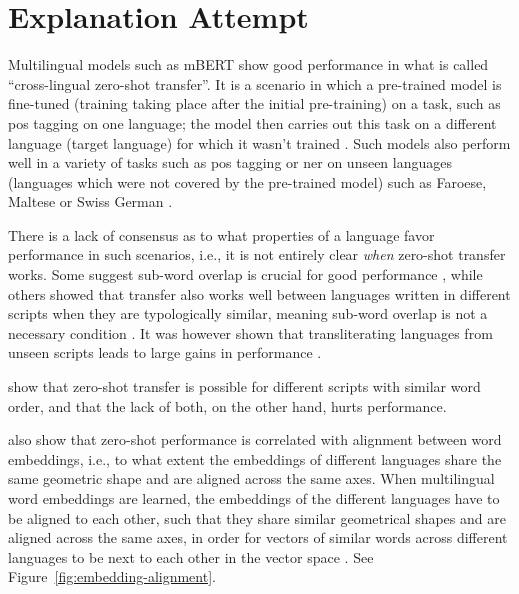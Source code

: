\section{Explanation Attempt}
Multilingual models such as mBERT show good performance in what is called \enquote{cross-lingual zero-shot transfer}. 
It is a scenario in which a pre-trained model is fine-tuned (training taking place after the initial pre-training) on a task, such as \acrshort{pos} tagging on one language; the model then carries out this task on a different language (target language) for which it wasn't trained \autocite{deshpande-etal-2022-bert}.
Such models also perform well in a variety of tasks such as \acrshort{pos} tagging or \acrshort{ner} on unseen languages (languages which were not covered by the pre-trained model) such as Faroese, Maltese or Swiss German \autocite{muller-et-al-2020}.

There is a lack of consensus as to what properties of a language favor performance in such scenarios, i.e., it is not entirely clear  \emph{when} zero-shot transfer works. 
Some suggest sub-word overlap is crucial for good performance \autocite{wu-dredze-2019-beto}, while others showed that transfer also works well between languages written in different scripts when they are typologically similar\footnotemark{}, meaning sub-word overlap is not a necessary condition \autocite{pires-etal-2019-multilingual}.  It was however shown that transliterating languages from unseen scripts leads to large gains in performance \autocite{muller-et-al-2020}.

\cite{deshpande-etal-2022-bert} show that zero-shot transfer is possible for different scripts with similar word order, and that the lack of both, on the other hand, hurts performance. 

\cite{deshpande-etal-2022-bert} also show that zero-shot performance is correlated with alignment between word embeddings, i.e., to what extent the embeddings of different languages share the same geometric shape and are aligned across the same axes. 
When multilingual word embeddings are learned, the embeddings of the different languages have to be aligned to each other, such that they share similar geometrical shapes and are aligned across the same axes, in order for vectors of similar words across different languages to be next to each other in the vector space \autocite[220-223]{koehn-2020}. See Figure~\ref{fig:embedding-alignment}.

